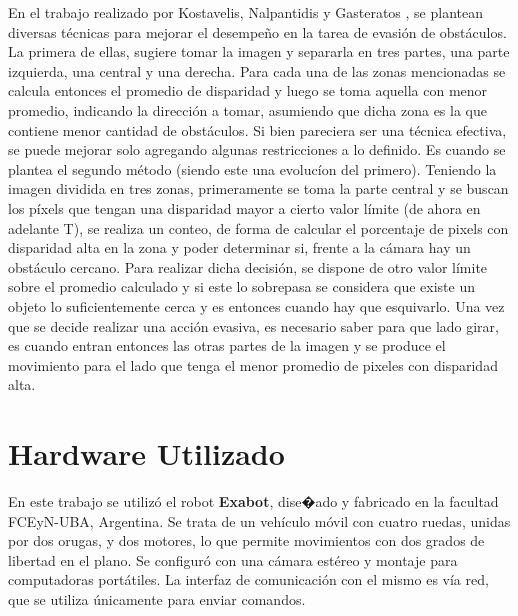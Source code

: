 \documentclass[journal]{IEEEtran}
\begin{document}
En el trabajo realizado por Kostavelis, Nalpantidis y Gasteratos \cite{KNG10}, se plantean diversas t\'ecnicas para mejorar el desempeño en la tarea de evasi\'on de obst\'aculos. La primera de ellas, sugiere tomar la imagen y separarla en tres partes, una parte izquierda, una central y una derecha. Para cada una de las zonas mencionadas se calcula entonces el promedio de disparidad y luego se toma aquella con menor promedio, indicando la direcci\'on a tomar, asumiendo que dicha zona es la que contiene menor cantidad de obst\'aculos. Si bien pareciera ser una t\'ecnica efectiva, se puede mejorar solo agregando algunas restricciones a lo definido. Es cuando se plantea el segundo m\'etodo (siendo este una evoluc\'ion del primero). Teniendo la imagen dividida en tres zonas, primeramente se toma la parte central y se buscan los p\'ixels que tengan una disparidad mayor a cierto valor l\'imite (de ahora en adelante T), se realiza un conteo, de forma de calcular el porcentaje de pixels con disparidad alta en la zona y poder determinar si, frente a la c\'amara hay un obst\'aculo cercano. Para realizar dicha decisi\'on, se dispone de otro valor l\'imite sobre el promedio calculado y si este lo sobrepasa se considera que existe un objeto lo suficientemente cerca y es entonces cuando hay que esquivarlo. Una vez que se decide realizar una acci\'on evasiva, es necesario saber para que lado girar, es cuando entran entonces las otras partes de la imagen y se produce el movimiento para el lado que tenga el menor promedio de pixeles con disparidad alta.

\section{Hardware Utilizado}
\label{sec:hardware}


En este trabajo se utiliz\'o el robot {\bf Exabot}, dise�ado y fabricado en la facultad FCEyN-UBA, Argentina. Se trata de un veh\'iculo m\'ovil con cuatro ruedas, unidas por dos orugas, y dos motores, lo que permite movimientos con dos grados de libertad en el plano. Se configur\'o con una c\'amara est\'ereo y montaje para computadoras port\'atiles. La interfaz de comunicaci\'on con el mismo es v\'ia red, que se utiliza \'unicamente para enviar comandos.
\end{document}
